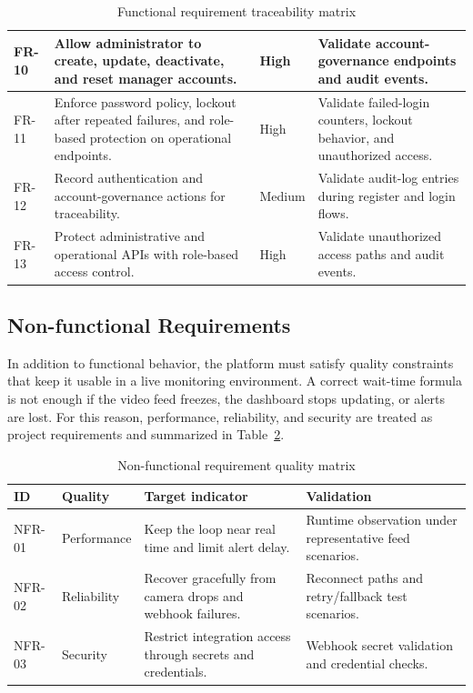 \begin{table}[H]
\begin{tabularx}{\textwidth}{|l|X|l|X|}
        FR-10 & Allow administrator to create, update, deactivate, and reset manager accounts. & High & Validate account-governance endpoints and audit events. \\ \hline
        FR-11 & Enforce password policy, lockout after repeated failures, and role-based protection on operational endpoints. & High & Validate failed-login counters, lockout behavior, and unauthorized access. \\ \hline
        FR-12 & Record authentication and account-governance actions for traceability. & Medium & Validate audit-log entries during register and login flows. \\ \hline
        FR-13 & Protect administrative and operational APIs with role-based access control. & High & Validate unauthorized access paths and audit events. \\ \hline
    \end{tabularx}
    \caption{Functional requirement traceability matrix}
    \label{tab:functional_requirement_matrix}
    \endgroup
\end{table}

\subsection{Non-functional Requirements}
In addition to functional behavior, the platform must satisfy quality constraints that keep it usable in a live monitoring environment. A correct wait-time formula is not enough if the video feed freezes, the dashboard stops updating, or alerts are lost. For this reason, performance, reliability, and security are treated as project requirements and summarized in Table~\ref{tab:nonfunctional_quality_matrix}.
\begin{table}[H]
    \centering
    \begingroup\setlength{\tabcolsep}{4pt}\renewcommand{\arraystretch}{0.95}\footnotesize
    \begin{tabularx}{\textwidth}{|l|X|X|X|}
        \hline
        ID & Quality & Target indicator & Validation \\ \hline
        NFR-01 & Performance & Keep the loop near real time and limit alert delay. & Runtime observation under representative feed scenarios. \\ \hline
        NFR-02 & Reliability & Recover gracefully from camera drops and webhook failures. & Reconnect paths and retry/fallback test scenarios. \\ \hline
        NFR-03 & Security & Restrict integration access through secrets and credentials. & Webhook secret validation and credential checks. \\ \hline
    \end{tabularx}
    \caption{Non-functional requirement quality matrix}
    \label{tab:nonfunctional_quality_matrix}
    \endgroup
\end{table}

